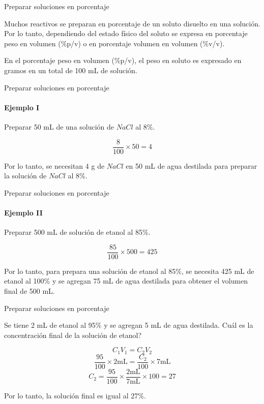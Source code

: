 \documentclass[12pt, aspectratio=169]{beamer}
\begin{document}
\begin{frame}{Preparar soluciones en porcentaje}
	
	Muchos reactivos se preparan en porcentaje de un soluto disuelto en una soluci\'on. Por lo tanto, dependiendo del estado f\'isico del soluto se expresa en porcentaje peso en volumen (\%p/v) o en porcentaje volumen en volumen (\%v/v).
	
	En el porcentaje peso en volumen (\%p/v), el peso en soluto es expresado en gramos en un total de 100 mL de soluci\'on.

\end{frame}

\begin{frame}{Preparar soluciones en porcentaje}
	\framesubtitle{Ejemplo I}
	Preparar 50 mL de una soluci\'on de $NaCl$ al 8\%.
	
	$$\frac{8}{100} \times 50 = 4$$
	
	Por lo tanto, se necesitan 4 g de $NaCl$ en 50 mL de agua destilada para preparar la soluci\'on de $NaCl$ al 8\%.
	
\end{frame}

\begin{frame}{Preparar soluciones en porcentaje}
	\framesubtitle{Ejemplo II}
	Preparar 500 mL de soluci\'on de etanol al 85\%.
	
	$$\frac{85}{100} \times 500 = 425$$
	
	Por lo tanto, para prepara una soluci\'on de etanol al 85\%, se necesita 425 mL de etanol al 100\% y se agregan 75 mL de agua destilada para obtener el volumen final de 500 mL. 
	
\end{frame}

\begin{frame}{Preparar soluciones en porcentaje}
		
	Se tiene 2 mL de etanol al 95\% y se agregan 5 mL de agua destilada. \textquestiondown Cu\'al es la concentraci\'on final de la soluci\'on de etanol?
	
	$$C_1V_1 = C_2V_2$$
	$$\frac{95}{100} \times 2 \text{mL} = \frac{C_2}{100} \times 7 \text{mL}$$
	$$C_2 = \frac{95}{100} \times \frac{2 \text{mL}}{ 7 \text{mL}} \times 100 = 27$$
	
	Por lo tanto, la soluci\'on final es igual al 27\%.
	
\end{frame}
\end{document}
